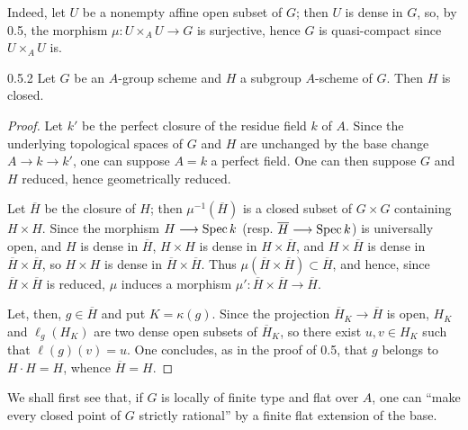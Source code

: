 Indeed, let $U$ be a nonempty affine open subset of $G$; then $U$ is dense in $G$, so, by 0.5, the morphism $\mu:U\times_AU\to G$ is surjective, hence $G$ is quasi-compact since $U\times_AU$ is.
\begin{corollary}{0.5.2}\label{VIA.0.5.2}
Let $G$ be an $A$-group scheme and $H$ a subgroup $A$-scheme of $G$. Then $H$ is closed.
\end{corollary}
\begin{proof}
Let $k'$ be the perfect closure of the residue field $k$ of $A$. Since the underlying topological spaces of $G$ and $H$ are unchanged by the base change $A\to k\to k'$, one can suppose $A=k$ a perfect field. One can then suppose $G$ and $H$ reduced, hence geometrically reduced.

Let $\overline H$ be the closure of $H$; then $\mu^{-1}(\overline H)$ is a closed subset of $G\times G$ containing $H\times H$. Since the morphism $H\longrightarrow\operatorname{Spec} k$ (resp. $\overline H\longrightarrow\operatorname{Spec} k$) is universally open, and $H$ is dense in $\overline H$, $H\times H$ is dense in $H\times\overline H$, and $H\times\overline H$ is dense in $\overline H\times\overline H$, so $H\times H$ is dense in $\overline H\times\overline H$. Thus $\mu(\overline H\times\overline H)\subset\overline H$, and hence, since $\overline H\times\overline H$ is reduced, $\mu$ induces a morphism $\mu':\overline H\times\overline H\to\overline H$.

Let, then, $g\in\overline H$ and put $K=\kappa(g)$. Since the projection $\overline H_K\to\overline H$ is open, $H_K$ and $\ell_g(H_K)$ are two dense open subsets of $\overline H_K$, so there exist $u,v\in H_K$ such that $\ell(g)(v)=u$. One concludes, as in the proof of 0.5, that $g$ belongs to $H\cdot H=H$, whence $\overline H=H$.
\end{proof}

We shall first see that, if $G$ is locally of finite type and flat over $A$, one can ``make every closed point of $G$ strictly rational'' by a finite flat extension of the base.

